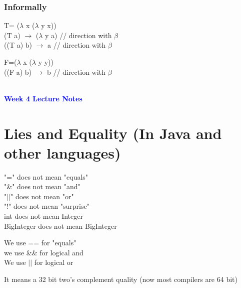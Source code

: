 \documentclass{article}
\begin{document}
\begin{flushleft}
\begin{flushleft}
\subsubsection*{Informally}
T= ($\lambda$ x ($\lambda$ y x)) \\
(T a) $\rightarrow$ ($\lambda$ y a) // direction with $\beta$\\
((T a) b) $\rightarrow$ a // direction with $\beta$
\end{flushleft}

\begin{flushleft}
F=($\lambda$ x ($\lambda$ y y))\\
((F a) b) $\rightarrow$ b // direction with $\beta$
\end{flushleft}

\end{flushleft}



\begin{flushleft}
\noindent\makebox[\linewidth]{\rule{\paperwidth}{0.4pt}}\\
\vspace*{1.5cm}
\textcolor{blue}{\textbf{{\huge Week 4 Lecture Notes}}}
\section*{Lies and Equality (In Java and other languages)}
"=" does not mean "equals" \\
"\&" does not mean "and"\\
"$||$" does not mean "or"\\   
"!" does not mean "surprise"\\
int does not mean Integer\\
BigInteger does not mean BigInteger\\              
\end{flushleft}

\begin{flushleft}
We use == for "equals"\\
we use \&\& for logical and\\
We use $||$ for logical or\\
\end{flushleft}

\doublespacing
\begin{flushleft}
It means a 32 bit two's complement quality (now most compilers are 64 bit)
\end{flushleft}
\end{document}
